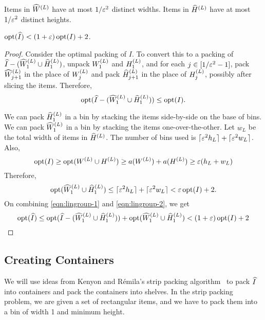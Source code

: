\begin{claim}
Items in $\widehat{W}^{(L)}$ have at most $1/\varepsilon^2$ distinct widths.
Items in $\widehat{H}^{(L)}$ have at most $1/\varepsilon^2$ distinct heights.
\end{claim}

\begin{lemma}
\label{thm:lingroup-opt-compare}
$\operatorname{opt}(\widehat{I}) < (1+\varepsilon)\operatorname{opt}(I) + 2$.
\end{lemma}
\begin{proof}
Consider the optimal packing of $I$.
To convert this to a packing of $\widehat{I} - (\widehat{W}^{(L)}_1 \cup \widehat{H}^{(L)}_1)$,
unpack $W^{(L)}_1$ and $H^{(L)}_1$, and for each $j \in [1/\varepsilon^2-1]$,
pack $\widehat{W}^{(L)}_{j+1}$ in the place of $W^{(L)}_j$
and pack $\widehat{H}^{(L)}_{j+1}$ in the place of $H^{(L)}_j$,
possibly after slicing the items.
Therefore,
\begin{equation}
\label{eqn:lingroup-1}
\operatorname{opt}(\widehat{I} - (\widehat{W}^{(L)}_1 \cup \widehat{H}^{(L)}_1)) \le \operatorname{opt}(I).
\end{equation}

We can pack $\widehat{H}^{(L)}_1$ in a bin by stacking the items side-by-side on the base of bins.
We can pack $\widehat{W}^{(L)}_1$ in a bin by stacking the items one-over-the-other.
Let $w_L$ be the total width of items in $\widehat{H}^{(L)}$. The number of bins used is
$\lceil \varepsilon^2h_L \rceil + \lceil \varepsilon^2w_L \rceil$. Also,
\[ \operatorname{opt}(I) \ge \operatorname{opt}(W^{(L)} \cup H^{(L)})
\ge a(W^{(L)}) + a(H^{(L)}) \ge \varepsilon(h_L + w_L) \]
Therefore,
\begin{equation}
\label{eqn:lingroup-2}
\operatorname{opt}(\widehat{W}^{(L)}_1 \cup \widehat{H}^{(L)}_1)
\le \lceil \varepsilon^2h_L \rceil + \lceil \varepsilon^2w_L \rceil < \varepsilon\operatorname{opt}(I) + 2.
\end{equation}
On combining \eqref{eqn:lingroup-1} and \eqref{eqn:lingroup-2}, we get
\[ \operatorname{opt}(\widehat{I}) \le \operatorname{opt}(\widehat{I} - (\widehat{W}^{(L)}_1 \cup \widehat{H}^{(L)}_1))
    + \operatorname{opt}(\widehat{W}^{(L)}_1 \cup \widehat{H}^{(L)}_1)
< (1+\varepsilon)\operatorname{opt}(I) + 2 \qedhere \]
\end{proof}

\subsection{Creating Containers}
\label{sec:bp-algo:create-containers}

We will use ideas from Kenyon and R\'emila's strip packing algorithm~\cite{kenyon1996strip}
to pack $\widehat{I}$ into containers and pack the containers into shelves.
In the strip packing problem, we are given a set of rectangular items,
and we have to pack them into a bin of width 1 and minimum height.

